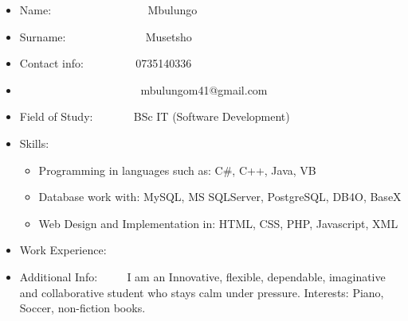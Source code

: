 \documentclass[12pt]{article}
\begin{document}
\begin{itemize}
\item Name: \ ~~~~~~~~~~~~~~ \ Mbulungo
\item Surname: \ ~~~~~~~~~~~ \ Musetsho
\item Contact info: \ ~~~~~~ \ 0735140336
\item \ ~~~~~~~~~~~~~~~~~~~ \ mbulungom41@gmail.com
\item Field of Study: \ ~~~~ \ BSc IT (Software Development)
\item Skills: \begin{itemize}
\item Programming in languages such as: C#, C++, Java, VB
\item Database work with: MySQL, MS SQLServer, PostgreSQL, DB4O, BaseX
\item Web Design and Implementation in: HTML, CSS, PHP, Javascript, XML
\end{itemize}
\item Work Experience: \begin{itemize}

\end{itemize}
\item Additional Info: \ ~~ \ I am an Innovative,  flexible, dependable, imaginative and collaborative student who stays calm under pressure. Interests: Piano, Soccer, non-fiction books.

\end{itemize}
\end{document}

